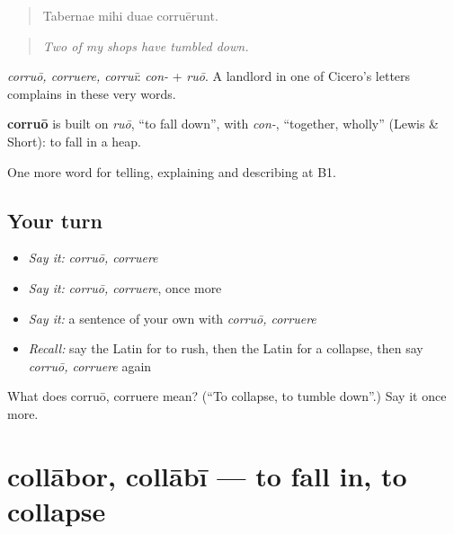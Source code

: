 \begin{quote}
Tabernae mihi duae corruērunt.
\end{quote}

\begin{quote}
\emph{Two of my shops have tumbled down.}
\end{quote}

\emph{corruō, corruere, corruī}: \emph{con-} + \emph{ruō}. A landlord in one of Cicero's letters complains in these very words.

\begin{cousinweb}
\textbf{corruō} is built on \emph{ruō}, \textquotedblleft{}to fall down\textquotedblright{}, with \emph{con-}, \textquotedblleft{}together, wholly\textquotedblright{} (Lewis \& Short): to fall in a heap.
\end{cousinweb}

\begin{grammarlens}[title={What you've built}]
One more word for telling, explaining and describing at B1.
\end{grammarlens}

\subsection*{Your turn}
\begin{itemize}
\raggedright
  \item \emph{Say it:} \emph{corruō, corruere}
  \item \emph{Say it:} \emph{corruō, corruere}, once more
  \item \emph{Say it:} a sentence of your own with \emph{corruō, corruere}
  \item \emph{Recall:} say the Latin for to rush, then the Latin for a collapse, then say \emph{corruō, corruere} again
\end{itemize}

\begin{tcolorbox}[breakable,colback=teal!4,colframe=teal!35!black,title={Before you move on}]
What does corruō, corruere mean? (\textquotedblleft{}To collapse, to tumble down\textquotedblright{}.) Say it once more.
\end{tcolorbox}
\section[collābor, collābī]{collābor, collābī — to fall in, to collapse}

\label{lesson:LA-C313-collabor}



